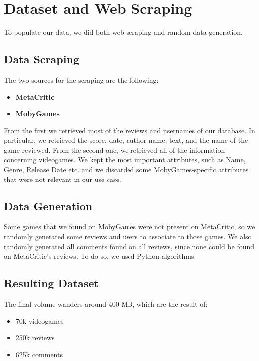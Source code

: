 \chapter{Dataset and Web Scraping}
To populate our data, we did both web scraping and random data generation.
\section{Data Scraping}
The two sources for the scraping are the following:
\begin{itemize}
	\item \textbf{MetaCritic}
	\item \textbf{MobyGames}
\end{itemize}
From the first we retrieved most of the reviews and usernames of our database.
In particular, we retrieved the score, date, author name, text, and the name of the game reviewed.
From the second one, we retrieved all of the information concerning videogames.
We kept the most important attributes, such as Name, Genre, Release Date etc. and we discarded
some MobyGames-specific attributes that were not relevant in our use case.

\section{Data Generation}

Some games that we found on MobyGames were not present on MetaCritic, so we randomly generated some reviews and users to associate to those games.
We also randomly generated all comments found on all reviews, since none could be found on MetaCritic's reviews.
To do so, we used Python algorithms.

\section{Resulting Dataset}
The final volume wanders around 400 MB, which are the result of:
\begin{itemize}
	\item 70k videogames
	\item 250k reviews 
	\item 625k comments
\end{itemize}

